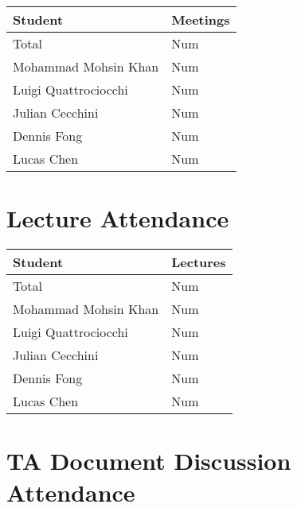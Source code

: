 \documentclass{article}
\begin{document}
\begin{table}[H]
\centering
\begin{tabular}{ll}
\toprule
\textbf{Student} & \textbf{Meetings}\\
\midrule
Total & Num\\
Mohammad Mohsin Khan & Num\\
Luigi Quattrociocchi & Num\\
Julian Cecchini & Num\\
Dennis Fong & Num\\
Lucas Chen & Num\\
\bottomrule
\end{tabular}
\end{table}


\section{Lecture Attendance}


\begin{table}[H]
\centering
\begin{tabular}{ll}
\toprule
\textbf{Student} & \textbf{Lectures}\\
\midrule
Total & Num\\
Mohammad Mohsin Khan & Num\\
Luigi Quattrociocchi & Num\\
Julian Cecchini & Num\\
Dennis Fong & Num\\
Lucas Chen & Num\\
\bottomrule
\end{tabular}
\end{table}


\section{TA Document Discussion Attendance}

\end{document}
